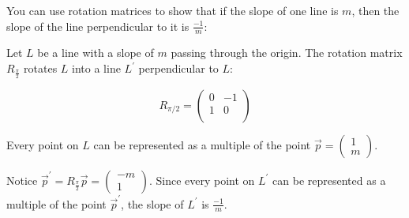 \documentclass[12pt]{article}
\begin{document}
You can use rotation matrices to show that if the slope of one line is $m$, then the slope of the line perpendicular to it is $\frac{-1}{m}$:

Let $L$ be a line with a slope of $m$ passing through the origin. The rotation matrix $R_{\frac{\pi}{2}}$ rotates $L$ into a line $L^\prime$ perpendicular to $L$:

$$ R_{\pi/2} = 
\begin{pmatrix}
0 & -1 \\
1 & 0 \\
\end{pmatrix}
$$

Every point on $L$ can be represented as a multiple of the point 
$ \vec{p} = \begin{pmatrix} 1 \\ m \end{pmatrix} $.

Notice $ \vec{p}^\prime = R_{\frac{\pi}{2}} \vec{p} = \begin{pmatrix} -m \\ 1 \end{pmatrix} $. Since every point on $L^\prime$ can be represented as a multiple of the point $\vec{p}^\prime$, the slope of $L^\prime$ is $\frac{-1}{m}$.
\end{document}
